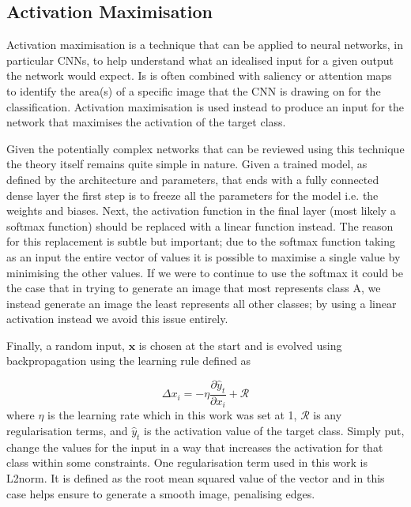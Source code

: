 \documentclass[12pt]{article}
\numberwithin{equation}{section}
\numberwithin{figure}{section}
\begin{document}
\subsection{Activation Maximisation} 
\label{sub:Activation_Maximisation} 
Activation maximisation is a technique that can be applied to neural networks, in particular CNNs, to help understand what an idealised input for a given output the network would expect. Is is often combined with saliency or attention maps to identify the area(s) of a specific image that the CNN is drawing on for the classification. Activation maximisation is used instead to produce an input for the network that maximises the activation of the target class. 

Given the potentially complex networks that can be reviewed using this technique the theory itself remains quite simple in nature. Given a trained model, as defined by the architecture and parameters, that ends with a fully connected dense layer the first step is to freeze all the parameters for the model i.e. the weights and biases. Next, the activation function in the final layer (most likely a softmax function) should be replaced with a linear function instead. The reason for this replacement is subtle but important; due to the softmax function taking as an input the entire vector of values it is possible to maximise a single value by minimising the other values. If we were to continue to use the softmax it could be the case that in trying to generate an image that most represents class A, we instead generate an image the least represents all other classes; by using a linear activation instead we avoid this issue entirely.

Finally, a random input, $\bm{x}$ is chosen at the start and is evolved using backpropagation using the learning rule defined as

\begin{equation}
	\label{eq:act_max}
	\Delta x_i = -\eta\frac{\partial \hat{y}_t}{\partial x_i} + \mathcal{R}
\end{equation}
where $\eta$ is the learning rate which in this work was set at 1, $\mathcal{R}$ is any regularisation terms, and $\hat{y}_t$ is the activation value of the target class. Simply put, change the values for the input in a way that increases the activation for that class within some constraints. One regularisation term used in this work is L2norm. It is defined as the root mean squared value of the vector and in this case helps ensure to generate a smooth image, penalising edges.
\end{document}
